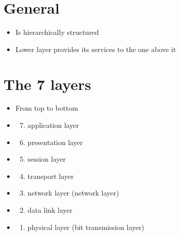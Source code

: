 \documentclass[10pt]{article}
\begin{document}
\section{General}
\begin{itemize}
  \item Is hierarchically structured

  \item Lower layer provides its services to the one above it

\end{itemize}

\section{The 7 layers}
\begin{itemize}
  \item From top to bottom

  \item 
  \begin{enumerate}
    \setcounter{enumii}{6}
    \item application layer
  \end{enumerate}
  \item 
  \begin{enumerate}
    \setcounter{enumii}{5}
    \item presentation layer
  \end{enumerate}
  \item 
  \begin{enumerate}
    \setcounter{enumii}{4}
    \item session layer
  \end{enumerate}
  \item 
  \begin{enumerate}
    \setcounter{enumii}{3}
    \item transport layer
  \end{enumerate}
  \item 
  \begin{enumerate}
    \setcounter{enumii}{2}
    \item network layer (network layer)
  \end{enumerate}
  \item 
  \begin{enumerate}
    \setcounter{enumii}{1}
    \item data link layer
  \end{enumerate}
  \item 
  \begin{enumerate}
    \item physical layer (bit transmission layer)
  \end{enumerate}
\end{itemize}
\end{document}
